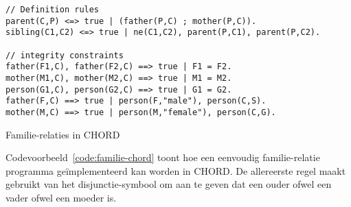 \begin{exCode}[bhp]
\begin{Verbatim}[frame=single]
// Definition rules
parent(C,P) <=> true | (father(P,C) ; mother(P,C)).
sibling(C1,C2) <=> true | ne(C1,C2), parent(P,C1), parent(P,C2).

// integrity constraints
father(F1,C), father(F2,C) ==> true | F1 = F2.
mother(M1,C), mother(M2,C) ==> true | M1 = M2.
person(G1,C), person(G2,C) ==> true | G1 = G2.
father(F,C) ==> true | person(F,"male"), person(C,S).
mother(M,C) ==> true | person(M,"female"), person(C,G).
\end{Verbatim}
\caption{Familie-relaties in CHORD}
\label{code:familie-chord}
\end{exCode}
Codevoorbeeld~\ref{code:familie-chord} toont hoe een eenvoudig familie-relatie programma ge\"implementeerd kan worden in CHORD. De allereerste regel maakt gebruikt van het disjunctie-symbool \code{;} om aan te geven dat een ouder ofwel een vader ofwel een moeder is.
